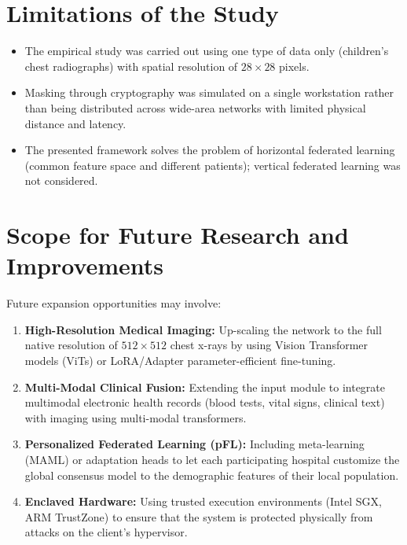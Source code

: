 \documentclass[12pt,a4paper]{report}
\begin{document}
\section{Limitations of the Study}
\begin{itemize}
    \item The empirical study was carried out using one type of data only (children’s chest radiographs) with spatial resolution of $28 \times 28$ pixels.
    \item Masking through cryptography was simulated on a single workstation rather than being distributed across wide-area networks with limited physical distance and latency.
    \item The presented framework solves the problem of horizontal federated learning (common feature space and different patients); vertical federated learning was not considered.
\end{itemize}

\section{Scope for Future Research and Improvements}
Future expansion opportunities may involve:
\begin{enumerate}
    \item \textbf{High-Resolution Medical Imaging:} Up-scaling the network to the full native resolution of $512 \times 512$ chest x-rays by using Vision Transformer models (ViTs) or LoRA/Adapter parameter-efficient fine-tuning.
    \item \textbf{Multi-Modal Clinical Fusion:} Extending the input module to integrate multimodal electronic health records (blood tests, vital signs, clinical text) with imaging using multi-modal transformers.
    \item \textbf{Personalized Federated Learning (pFL):} Including meta-learning (MAML) or adaptation heads to let each participating hospital customize the global consensus model to the demographic features of their local population.
    \item \textbf{Enclaved Hardware:} Using trusted execution environments (Intel SGX, ARM TrustZone) to ensure that the system is protected physically from attacks on the client's hypervisor.
\end{enumerate}

\newpage
\renewcommand{\bibname}{References}
\end{document}
